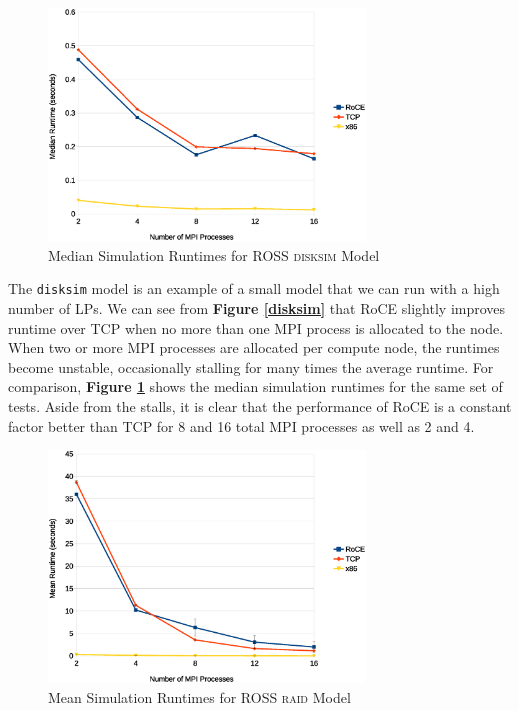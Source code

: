 \documentclass[11pt]{book}
\begin{document}
\begin{figure}
\centering
\includegraphics[width=0.75\textwidth]{disksim_median}
\caption{Median Simulation Runtimes for ROSS \textsc{disksim} Model}
\label{disksim-median}
\end{figure}

The \verb;disksim; model is an example of a small model that we can run with a
high number of LPs. We can see from \textbf{Figure \ref{disksim}} that RoCE
slightly improves runtime over TCP when no more than one MPI process is
allocated to the node. When two or more MPI processes are allocated per compute
node, the runtimes become unstable, occasionally stalling for many times the
average runtime. For comparison, \textbf{Figure \ref{disksim-median}} shows the
median simulation runtimes for the same set of tests. Aside from the stalls, it
is clear that the performance of RoCE is a constant factor better than TCP for 8
and 16 total MPI processes as well as 2 and 4.

\begin{figure}
\centering
\includegraphics[width=0.75\textwidth]{raid}
\caption{Mean Simulation Runtimes for ROSS \textsc{raid} Model}
\label{raid}
\end{figure}
\end{document}
